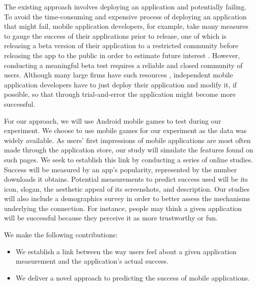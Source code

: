 The existing approach involves deploying an application and potentially failing. To avoid the time-consuming and expensive process of deploying an application that might fail, mobile application developers, for example, take many measures to gauge the success of their applications prior to release, one of which is releasing a beta version of their application to a restricted community before releasing the app to the public in order to estimate future interest \cite{needsource}. However, conducting a meaningful beta test requires a reliable and closed community of users. Although many large firms have such resources \cite{needsource}, independent mobile application developers have to just deploy their application and modify it, if possible, so that through trial-and-error the application might become more successful.

For our approach, we will use Android mobile games to test during our experiment. We choose to use mobile games for our experiment as the data was widely available. As users' first impressions of mobile applications are most often made through the application store, our study will simulate the features found on such pages. We seek to establish this link by conducting a series of online studies. Success will be measured by an app's popularity, represented by the number downloads it obtains. Potential measurements to predict success used will be its icon, slogan, the aesthetic appeal of its screenshots, and description. Our studies will also include a demographics survey in order to better assess the mechanisms underlying the connection. For instance, people may think a given application will be successful because they perceive it as more trustworthy or fun.

We make the following contributions:
\begin{itemize}
\item We establish a link between the way users feel about a given application measurement and the application's actual success.
\item We deliver a novel approach to predicting the success of mobile applications.
\end{itemize}

